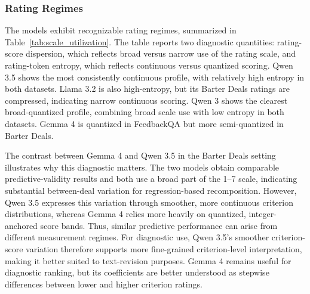 \subsubsection{Rating Regimes}

The models exhibit recognizable rating regimes, summarized in Table~\ref{tab:scale_utilization}. The table reports two diagnostic quantities: rating-score dispersion, which reflects broad versus narrow use of the rating scale, and rating-token entropy, which reflects continuous versus quantized scoring. Qwen 3.5 shows the most consistently continuous profile, with relatively high entropy in both datasets. Llama 3.2 is also high-entropy, but its Barter Deals ratings are compressed, indicating narrow continuous scoring. Qwen 3 shows the clearest broad-quantized profile, combining broad scale use with low entropy in both datasets. Gemma 4 is quantized in FeedbackQA but more semi-quantized in Barter Deals.

The contrast between Gemma 4 and Qwen 3.5 in the Barter Deals setting illustrates why this diagnostic matters. The two models obtain comparable predictive-validity results and both use a broad part of the 1--7 scale, indicating substantial between-deal variation for regression-based recomposition. However, Qwen 3.5 expresses this variation through smoother, more continuous criterion distributions, whereas Gemma 4 relies more heavily on quantized, integer-anchored score bands. Thus, similar predictive performance can arise from different measurement regimes. For diagnostic use, Qwen 3.5's smoother criterion-score variation therefore supports more fine-grained criterion-level interpretation, making it better suited to text-revision purposes. Gemma 4 remains useful for diagnostic ranking, but its coefficients are better understood as stepwise differences between lower and higher criterion ratings.

